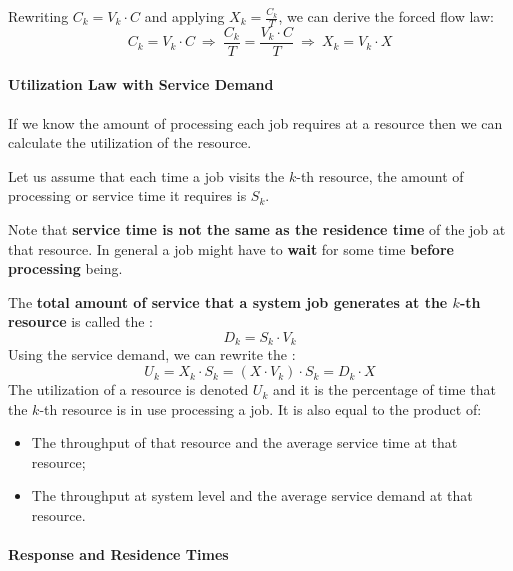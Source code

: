 \highspace
Rewriting $C_{k} = V_{k} \cdot C$ and applying $X_{k} = \frac{C_{k}}{T}$, we can derive the forced flow law:
\begin{equation*}
	C_{k} = V_{k} \cdot C \: \Rightarrow \: \dfrac{C_{k}}{T} = \dfrac{V_{k} \cdot C}{T} \: \Rightarrow \: X_{k} = V_{k} \cdot X
\end{equation*}

\longline

\paragraph{Utilization Law with Service Demand}

If we know the amount of processing each job requires at a resource then we can calculate the utilization of the resource.

\highspace
Let us assume that each time a job visits the $k$-th resource, the amount of processing or service time it requires is $S_{k}$.

\highspace
Note that \textbf{service time is not the same as the residence time} of the job at that resource. In general a job might have to \textbf{wait} for some time \textbf{before processing} being.

\highspace
The \textbf{total amount of service that a system job generates at the $k$-th resource} is called the :
\begin{equation}\label{eq: Service Demand}
	D_{k} = S_{k} \cdot V_{k}
\end{equation}
Using the service demand, we can rewrite the :
\begin{equation}\label{eq: Utilization Law with Service Demand}
	U_{k} = X_{k} \cdot S_{k} = \left(X \cdot V_{k}\right) \cdot S_{k} = D_{k} \cdot X
\end{equation}
The utilization of a resource is denoted $U_{k}$ and it is the percentage of time that the $k$-th resource is in use processing a job. It is also equal to the product of:
\begin{itemize}
	\item The throughput of that resource and the average service time at that resource;
	
	\item The throughput at system level and the average service demand at that resource.
\end{itemize}

\newpage

\paragraph{Response and Residence Times}

